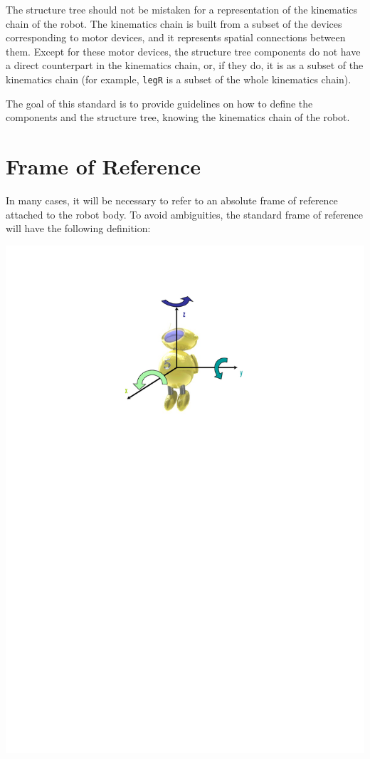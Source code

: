 The structure tree should not be mistaken for a representation of the
kinematics chain of the robot. The kinematics chain is built from a
subset of the devices corresponding to motor devices, and it represents
spatial connections between them. Except for these motor devices, the
structure tree components do not have a direct counterpart in the
kinematics chain, or, if they do, it is as a subset of the kinematics
chain (for example, \texttt{legR} is a subset of the whole kinematics
chain).


The goal of this standard is to provide guidelines on how to define the
components and the structure tree, knowing the kinematics chain of the
robot.

\section{Frame of Reference}

In many cases, it will be necessary to refer to an absolute frame of
reference attached to the robot body. To avoid ambiguities, the
standard frame of reference will have the following definition:

\begin{center}
  \includegraphics{img/reference-frame}
\end{center}


